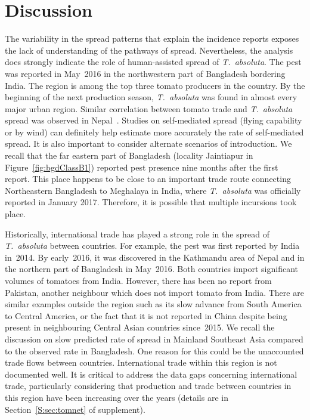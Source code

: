 \documentclass[11pt]{article}
\newcommand{\tuta}{\emph{T.~absoluta}}
\theoremstyle{definition}
\begin{document}
\section{Discussion}
The variability in the spread patterns that explain the incidence reports
exposes the lack of understanding of the pathways of spread.  Nevertheless,
the analysis does strongly indicate the role of human-assisted spread of
\tuta{}. The pest was reported in May~2016 in the northwestern part of
Bangladesh bordering India. The region is among the top three tomato
producers in the country. By the beginning of the next production season,
\tuta{} was found in almost every major urban region.  Similar correlation
between tomato trade and \tuta{} spread was observed in
Nepal~\cite{venkatramanan2019modeling}. Studies on self-mediated spread
(flying capability or by wind) can definitely help estimate more accurately
the rate of self-mediated spread. It is also important to consider
alternate scenarios of introduction. We recall that the far eastern part of
Bangladesh (locality Jaintiapur in Figure~\ref{fig:bgdClassB1}) reported
pest presence nine months after the first report. This place happens to be
close to an important trade route connecting Northeastern Bangladesh to
Meghalaya in India, where \tuta{} was officially reported in January 2017.
Therefore, it is possible that multiple incursions took place. 

Historically, international trade has played a strong role in the spread of
\tuta{} between countries. For example, the pest was first reported by
India in~2014. By early~2016, it was discovered in the Kathmandu area of
Nepal and in the northern part of Bangladesh in May~2016. Both countries import
significant volumes of tomatoes from India. However, there has been no report
from Pakistan, another neighbour which does not import tomato from India.
There are similar examples outside the region such as its slow advance from
South America to Central America, or the fact that it is not reported in
China despite being present in neighbouring Central Asian countries
since~2015.  We recall the discussion on slow predicted rate of spread in
Mainland Southeast Asia compared to the observed rate in Bangladesh. One
reason for this could be the unaccounted trade flows between countries.
International trade within this region is not documented well.  It is
critical to address the data gaps concerning international trade,
particularly considering that production and trade between countries in
this region have been increasing over the years (details are in
Section~\ref{S:sec:tomnet} of supplement).
\end{document}
